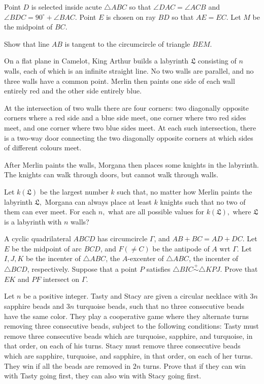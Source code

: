 \documentclass[11pt]{scrartcl}
\begin{document}
\begin{problem}[978369715927760]
Point $D$ is selected inside acute $\triangle ABC$ so that $\angle DAC = \angle ACB$ and $\angle BDC = 90^{\circ} + \angle BAC$. Point $E$ is chosen on ray $BD$ so that $AE = EC$. Let $M$ be the midpoint of $BC$.

Show that line $AB$ is tangent to the circumcircle of triangle $BEM$.
\end{problem}
\begin{problem}[2252133047011954512]
On a flat plane in Camelot, King Arthur builds a labyrinth $\mathfrak{L}$ consisting of $n$ walls, each of which is an infinite straight line. No two walls are parallel, and no three walls have a common point. Merlin then paints one side of each wall entirely red and the other side entirely blue.

At the intersection of two walls there are four corners: two diagonally opposite corners where a red side and a blue side meet, one corner where two red sides meet, and one corner where two blue sides meet. At each such intersection, there is a two-way door connecting the two diagonally opposite corners at which sides of different colours meet.

After Merlin paints the walls, Morgana then places some knights in the labyrinth. The knights can walk through doors, but cannot walk through walls.

Let $k(\mathfrak{L})$ be the largest number $k$ such that, no matter how Merlin paints the labyrinth $\mathfrak{L},$ Morgana can always place at least $k$ knights such that no two of them can ever meet. For each $n,$ what are all possible values for $k(\mathfrak{L}),$ where $\mathfrak{L}$ is a labyrinth with $n$ walls?
\end{problem}
\begin{problem}[571352513856417722]
	A cyclic quadrilateral $ABCD$ has circumcircle $\Gamma$, and $AB+BC=AD+DC$. Let $E$ be the midpoint of arc $BCD$, and $F (\neq C)$ be the antipode of $A$ wrt $\Gamma$. Let $I,J,K$ be the incenter of $\triangle ABC$, the $A$-excenter of $\triangle ABC$, the incenter of $\triangle BCD$, respectively.
Suppose that a point $P$ satisfies $\triangle BIC \stackrel{+}{\sim} \triangle KPJ$. Prove that $EK$ and $PF$ intersect on $\Gamma.$
\end{problem}
\begin{problem}[692237787009642]
	Let $n$ be a positive integer. Tasty and Stacy are given a circular necklace with $3n$ sapphire beads and $3n$ turquoise beads, such that no three consecutive beads have the same color. They play a cooperative game where they alternate turns removing three consecutive beads, subject to the following conditions:
Tasty must remove three consecutive beads which are turquoise, sapphire, and turquoise, in that order, on each of his turns.
Stacy must remove three consecutive beads which are sapphire, turquoise, and sapphire, in that order, on each of her turns.
They win if all the beads are removed in $2n$ turns. Prove that if they can win with Tasty going first, they can also win with Stacy going first.
\end{problem}
\end{document}
